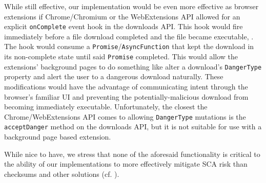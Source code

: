 While still effective, our implementation would be even more effective as
browser extensions if Chrome/Chromium or the WebExtensions API allowed for an
explicit \texttt{onComplete} event hook in the downloads API. This hook would
fire immediately before a file download completed and the file became
executable, . The hook would consume a \texttt{Promise}/\texttt{AsyncFunction} that
kept the download in its non-complete state until said \texttt{Promise}
completed. This would allow the extensions' background pages to do something
like alter a download's \texttt{DangerType} property and alert the user to a
dangerous download naturally. These modifications would have the advantage of
communicating intent through the browser's familiar UI and preventing the
potentially-malicious download from becoming immediately executable.
Unfortunately, the closest the Chrome/WebExtensions API comes to allowing
\texttt{DangerType} mutations is the \texttt{acceptDanger} method on the
downloads API, but it is not suitable for use with a background page based
extension.

While nice to have, we stress that none of the aforesaid functionality is
critical to the ability of our implementations to more effectively mitigate SCA
risk than checksums and other solutions (cf. ).






